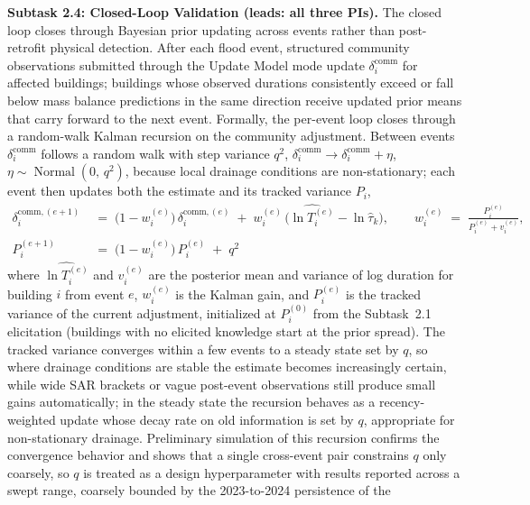 \documentclass[11pt]{article}
\begin{document}
\textbf{Subtask 2.4: Closed-Loop Validation
(leads: all three PIs).}
The closed loop closes through Bayesian prior updating across events rather than
post-retrofit physical detection.
After each flood event, structured community observations submitted through the
Update Model mode update $\delta_i^{\mathrm{comm}}$ for affected buildings;
buildings whose observed durations consistently exceed or fall below mass balance
predictions in the same direction receive updated prior means that carry forward
to the next event.
Formally, the per-event loop closes through a random-walk Kalman recursion on the
community adjustment. Between events $\delta_i^{\mathrm{comm}}$ follows a random
walk with step variance $q^2$,
$\delta_i^{\mathrm{comm}} \to \delta_i^{\mathrm{comm}} + \eta$,
$\eta \sim \operatorname{Normal}(0,\, q^2)$, because local drainage conditions are
non-stationary; each event then updates both the estimate and its tracked
variance $P_i$,
\begin{equation}\label{eq:deltaupdate}
\begin{aligned}
  \delta_i^{\mathrm{comm},(e+1)} &\;=\;
  \bigl(1 - w_i^{(e)}\bigr)\,\delta_i^{\mathrm{comm},(e)}
  \;+\; w_i^{(e)}\,\bigl(\widehat{\ln T_i^{(e)}} - \ln \hat{\tau}_k\bigr),
  \qquad
  w_i^{(e)} \;=\; \frac{P_i^{(e)}}{P_i^{(e)} + v_i^{(e)}},\\[2pt]
  P_i^{(e+1)} &\;=\; \bigl(1 - w_i^{(e)}\bigr)\,P_i^{(e)} \;+\; q^2
\end{aligned}
\end{equation}
where $\widehat{\ln T_i^{(e)}}$ and $v_i^{(e)}$ are the posterior mean and
variance of log duration for building $i$ from event $e$, $w_i^{(e)}$ is the
Kalman gain, and $P_i^{(e)}$ is the tracked variance of the current adjustment,
initialized at $P_i^{(0)}$ from the Subtask~2.1 elicitation (buildings with no
elicited knowledge start at the prior spread). The tracked variance converges
within a few events to a steady state set by $q$, so where drainage conditions
are stable the estimate becomes increasingly certain, while wide SAR brackets or
vague post-event observations still produce small gains automatically; in the
steady state the recursion behaves as a recency-weighted update whose decay rate
on old information is set by $q$, appropriate for non-stationary drainage.
Preliminary simulation of this recursion confirms the convergence
behavior and shows that a single cross-event pair constrains $q$ only coarsely,
so $q$ is treated as a design hyperparameter with results reported across a
swept range, coarsely bounded by the 2023-to-2024 persistence of the
\end{document}

